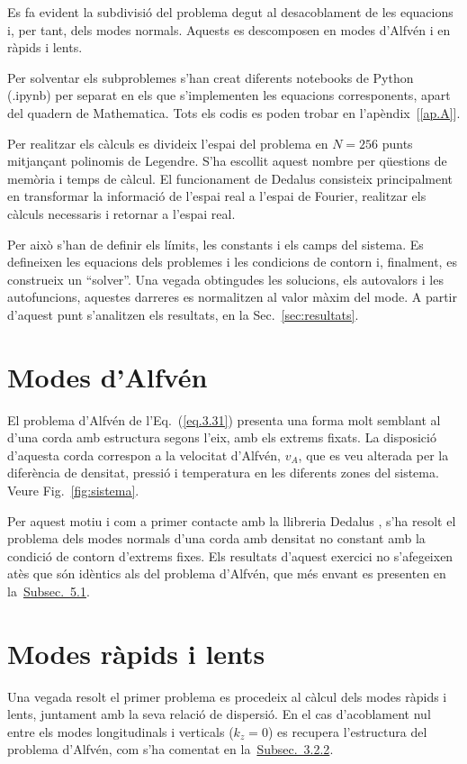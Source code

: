 Es fa evident la subdivisió del problema degut al desacoblament de les equacions i, per tant, dels modes normals.
Aquests es descomposen en modes d'Alfvén i en ràpids i lents.

Per solventar els subproblemes s'han creat diferents notebooks de Python (.ipynb) per separat en els que s'implementen les equacions corresponents,
apart del quadern de Mathematica. Tots els codis es poden trobar en l'apèndix~[\ref{ap.A}]. %

Per realitzar els càlculs es divideix l'espai del problema en $N = 256$ punts mitjançant polinomis de Legendre.
S'ha escollit aquest nombre per qüestions de memòria i temps de càlcul.
El funcionament de Dedalus consisteix principalment en transformar la informació de l'espai real a l'espai de Fourier,
realitzar els càlculs necessaris i retornar a l'espai real.

Per això s'han de definir els límits, les constants i els camps del sistema.
Es defineixen les equacions dels problemes i les condicions de contorn i, finalment, es construeix un ``solver''.
Una vegada obtingudes les solucions, els autovalors i les autofuncions, aquestes darreres es normalitzen al valor màxim del mode.
A partir d'aquest punt s'analitzen els resultats, en la Sec.~\ref{sec:resultats}.


\section{Modes d'Alfvén} \label{subsec:mètode_Alfvén}
El problema d'Alfvén de l'Eq.~(\ref{eq.3.31}) presenta una forma molt semblant al d'una corda amb estructura segons l'eix, amb els extrems fixats.
La disposició d'aquesta corda correspon a la velocitat d'Alfvén, $v_A$, que es veu alterada per la diferència de densitat,
pressió i temperatura en les diferents zones del sistema. Veure Fig.~\ref{fig:sistema}.

Per aquest motiu i com a primer contacte amb la llibreria Dedalus \parencite{Dedalus},
s'ha resolt el problema dels modes normals d'una corda amb densitat no constant amb la condició de contorn d'extrems fixes.
Els resultats d'aquest exercici no s'afegeixen atès que són idèntics als del problema d'Alfvén,
que més envant es presenten en la~\hyperref[subsec:resultats_modes_Alfvén]{Subsec.~5.1}.


\section{Modes ràpids i lents} \label{subsec:mètode_r_i_l}
Una vegada resolt el primer problema es procedeix al càlcul dels modes ràpids i lents, juntament amb la seva relació de dispersió.
En el cas d'acoblament nul entre els modes longitudinals i verticals ($k_z = 0$) es recupera l'estructura del problema d'Alfvén,
com s'ha comentat en la~\hyperref[subsubsec:ones_modes_r_i_l]{Subsec.~3.2.2}.


